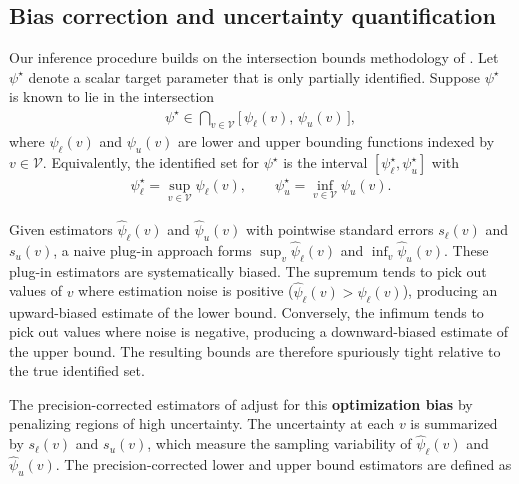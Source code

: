\documentclass[accepted]{uai2026} %
\theoremstyle{plain}
\theoremstyle{definition}
\theoremstyle{remark}
\begin{document}
\subsection{Bias correction and uncertainty quantification}

Our inference procedure builds on the intersection bounds methodology of
\cite{chernozhukov2013intersection}.
Let $\psi^\star$ denote a scalar target parameter that is only partially
identified.
Suppose $\psi^\star$ is known to lie in the intersection
\begin{align}
\psi^\star
  \in \bigcap_{v \in \mathcal{V}}
     \bigl[\,\psi_\ell(v),\,\psi_u(v)\,\bigr],
\end{align}
where $\psi_\ell(v)$ and $\psi_u(v)$ are lower and upper bounding functions
indexed by $v \in \mathcal{V}$.
Equivalently, the identified set for $\psi^\star$ is the interval
$[\psi_\ell^\star, \psi_u^\star]$ with
\begin{align}
\psi_\ell^\star
  = \sup_{v \in \mathcal{V}} \psi_\ell(v),
\qquad
\psi_u^\star
  = \inf_{v \in \mathcal{V}} \psi_u(v).
\end{align}

Given estimators $\hat{\psi}_\ell(v)$ and $\hat{\psi}_u(v)$ with pointwise
standard errors $s_\ell(v)$ and $s_u(v)$, a naive plug-in approach forms
$\sup_{v} \hat{\psi}_\ell(v)$ and $\inf_{v} \hat{\psi}_u(v)$.
These plug-in estimators are systematically biased.
The supremum tends to pick out values of $v$ where estimation noise is positive
($\hat{\psi}_\ell(v) > \psi_\ell(v)$), producing an upward-biased estimate of the
lower bound.
Conversely, the infimum tends to pick out values where noise is negative,
producing a downward-biased estimate of the upper bound.
The resulting bounds are therefore spuriously tight relative to the true
identified set.

The precision-corrected estimators of \cite{chernozhukov2013intersection}
adjust for this \textbf{optimization bias} by penalizing regions of high uncertainty.
The uncertainty at each $v$ is summarized by $s_\ell(v)$ and $s_u(v)$, which
measure the sampling variability of $\hat{\psi}_\ell(v)$ and
$\hat{\psi}_u(v)$.
The precision-corrected lower and upper bound estimators are defined as
\end{document}
